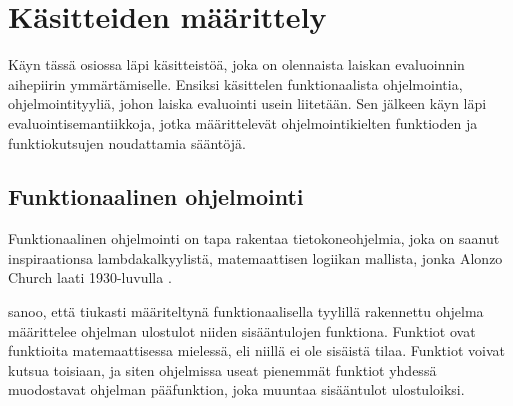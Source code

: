 \section{Käsitteiden määrittely}\label{kasitteisto}

Käyn tässä osiossa läpi käsitteistöä, joka on olennaista laiskan evaluoinnin aihepiirin ymmärtämiselle. Ensiksi käsittelen funktionaalista ohjelmointia, ohjelmointityyliä, johon laiska evaluointi usein liitetään. Sen jälkeen käyn läpi evaluointisemantiikkoja, jotka määrittelevät ohjelmointikielten funktioden ja funktiokutsujen noudattamia sääntöjä.

\subsection{Funktionaalinen ohjelmointi}
Funktionaalinen ohjelmointi on tapa rakentaa tietokoneohjelmia, joka on saanut inspiraationsa lambdakalkyylistä, matemaattisen logiikan mallista, jonka Alonzo Church laati 1930-luvulla \citep{church1932set}.

\citet{scott2009programming} sanoo, että tiukasti määriteltynä funktionaalisella tyylillä rakennettu ohjelma määrittelee ohjelman ulostulot niiden sisääntulojen funktiona. Funktiot ovat funktioita matemaattisessa mielessä, eli niillä ei ole sisäistä tilaa. Funktiot voivat kutsua toisiaan, ja siten ohjelmissa useat pienemmät funktiot yhdessä muodostavat ohjelman pääfunktion, joka muuntaa sisääntulot ulostuloiksi.


